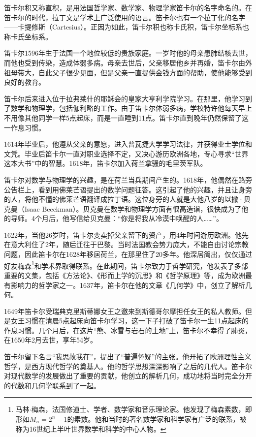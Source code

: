 \documentclass{article}
\begin{document}
 
笛卡尔积又称直积，是用法国哲学家、数学家、物理学家笛卡尔的名字命名的。在笛卡尔的时代，拉丁文是学术上广泛使用的语言。笛卡尔也有一个拉丁化的名字——卡提修斯（Cartesius）。正因为如此，笛卡尔积也称卡氏积，笛卡尔坐标系也称卡氏坐标系。

笛卡尔1596年生于法国一个地位较低的贵族家庭。一岁时他的母亲患肺结核去世，而他也受到传染，造成体弱多病。母亲去世后，父亲移居他乡并再婚，笛卡尔由外祖母带大，自此父子很少见面，但是父亲一直提供金钱方面的帮助，使他能够受到良好的教育。

笛卡尔后来进入位于拉弗莱什的耶稣会的皇家大亨利学院学习。在那里，他学习到了数学和物理学，包括伽利略的工作。由于笛卡尔体弱多病，学校特许他每天早上不用像其他同学一样5点起床，而是一直睡到11点。笛卡尔直到晚年仍然保留了这一作息习惯。

1614年毕业后，他遵从父亲的意愿，进入普瓦捷大学学习法律，并获得业士学位和文凭。毕业后笛卡尔一直对职业选择不定，又决心游历欧洲各地，专心寻求“世界这本大书”中的智慧。1618年，笛卡尔加入荷兰拿骚的毛里茨军队。

笛卡尔对数学与物理学的兴趣，是在荷兰当兵期间产生的。1618年，他偶然在路旁公告栏上，看到用佛莱芒语提出的数学问题征答。这引起了他的兴趣，并且让身旁的人，将他不懂的佛莱芒语翻译成拉丁语。这位身旁的人就是大他八岁的以撒·贝克曼（Isaac Beeckman）。贝克曼在数学和物理学方面有很高造诣，很快成为了他的导师。4个月后，他写信给贝克曼：“你是将我从冷漠中唤醒的人……”。

1622年，当他26岁时，笛卡尔变卖掉父亲留下的资产，用4年时间游历欧洲。他先在意大利住了2年，随后迁往于巴黎。当时法国教会势力庞大，不能自由讨论宗教问题，因此笛卡尔在1628年移居荷兰，在那里住了20多年。他深居简出，仅仅通过好友梅森\footnote{马林$\cdot$梅森，法国修道士、学者、数学家和音乐理论家。他发现了梅森素数，即形如$M_n = 2^n − 1$的素数。他和当时的著名数学家和科学家有广泛的联系，被称为16世纪上半叶世界数学和科学的中心人物。}和学术界取得联系。在此期间，笛卡尔致力于哲学研究，他发表了多部重要的文集，包括《方法论》、《形而上学的沉思》和《哲学原理》等，成为欧洲最有影响力的哲学家之一。1637年，笛卡尔在他的文章《几何学》中，创立了解析几何。

1649年笛卡尔受瑞典克里斯蒂娜女王之邀来到斯德哥尔摩担任女王的私人教师。但是女王习惯在清晨5点起床向笛卡尔学习，这一下子打破了笛卡尔一生11点起床的作息习惯。几个月后，在这片“熊、冰雪与岩石的土地”上，笛卡尔不幸得了肺炎，在1650年2月去世，享年54岁。

笛卡尔留下名言“我思故我在”，提出了“普遍怀疑”的主张。他开拓了欧洲理性主义哲学，是西方现代哲学的奠基人。他的哲学思想深深影响了之后的几代人。笛卡尔对现代数学的发展做出了重要的贡献，他创立的解析几何，成功地将当时完全分开的代数和几何学联系到了一起。
\end{document}
